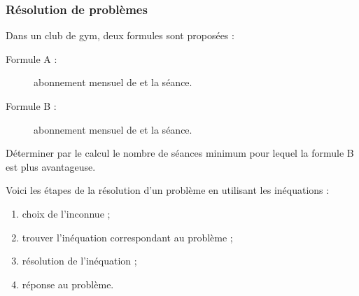 \documentclass[10pt,openright,twoside,french]{book}
\begin{document}
\subsubsection{Résolution de problèmes}

\begin{Exemple}
    Dans un club de gym, deux formules sont proposées :
    \begin{description}
        \item[Formule A :] abonnement mensuel de  et  la séance.
        \item[Formule B :] abonnement mensuel de  et  la séance.
    \end{description}
    Déterminer par le calcul le nombre de séances minimum pour lequel la formule B est plus avantageuse.
\end{Exemple}\medskip

Voici les étapes de la résolution d'un problème en utilisant les inéquations :
\begin{enumerate}
    \item choix de l'inconnue ;
    \item trouver l'inéquation correspondant au problème ;
    \item résolution de l'inéquation ;
    \item réponse au problème.
\end{enumerate}\medskip
\end{document}
